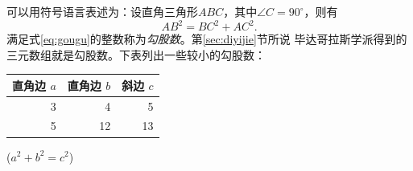 \documentclass[UTF8]{ctexart}
\newcommand\degree{^\circ}
\begin{document}
    可以用符号语言表述为：设直角三角形$ABC$，其中$\angle C = 90\degree$，则有
    \begin{equation}\label{eq:gougu}
    AB^2 = BC^2 + AC^2.
    \end{equation}
    满足式\eqref{eq:gougu}的整数称为\emph{勾股数}。第\ref{sec:diyijie}节所说
    毕达哥拉斯学派得到的三元数组就是勾股数。下表列出一些较小的勾股数：
    \begin{table}[H]
        \begin{tabular}{|rrr|}
            \hline
            直角边 $a$ & 直角边 $b$ & 斜边 $c$ \\
            \hline
            3 & 4 & 5 \\
            5 & 12 & 13 \\
            \hline
        \end{tabular}%
        \qquad
        ($a^2 + b^2 = c^2$)
    \end{table}
    \nocite{Shiye}
    
\end{document}
